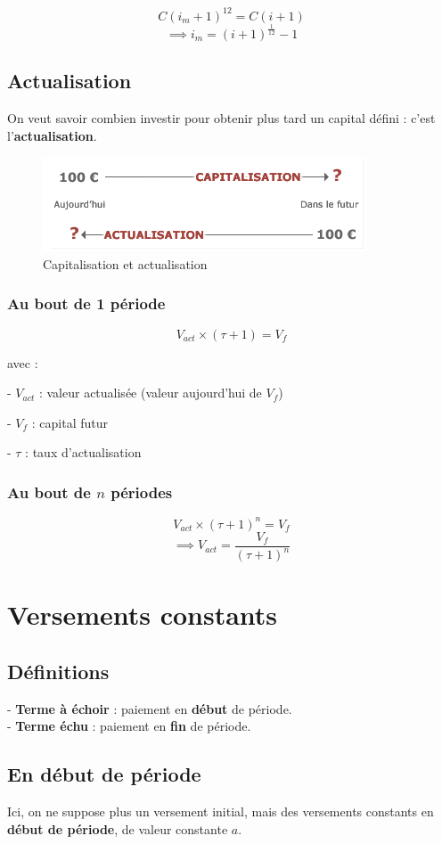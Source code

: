 \documentclass{article}
\begin{document}
$$C(i_m+1)^{12} = C(i+1)$$ $$\implies \boxed{i_m = (i+1)^{\frac{1}{12}} - 1}$$


\subsection{Actualisation}
On veut savoir combien investir pour obtenir plus tard un capital défini : c'est l'\textbf{actualisation}.


\begin{figure}[h]
    \centering
    \includegraphics{capi-vs-actu.png}
    \\Capitalisation et actualisation
\end{figure}

\subsubsection{Au bout de 1 période}
$$V_{act} \times(\tau+1)= V_f$$

avec :

- $V_{act}$ : valeur actualisée (valeur aujourd'hui de $V_f$)

- $V_f$ : capital futur

- $\tau$ : taux d'actualisation

\subsubsection{Au bout de $n$ périodes}
$$V_{act} \times(\tau+1)^n= V_f$$
$$\implies \boxed{V_{act} = \dfrac{V_f}{(\tau+1)^n}}$$


\section{Versements constants}
\subsection{Définitions}
- \textbf{Terme à échoir} : paiement en \textbf{début} de période.
%
\\ - \textbf{Terme échu} : paiement en \textbf{fin} de période.

\subsection{En début de période}
Ici, on ne suppose plus un versement initial, mais des versements constants en \textbf{début de période}, de valeur constante $a$.
\end{document}
